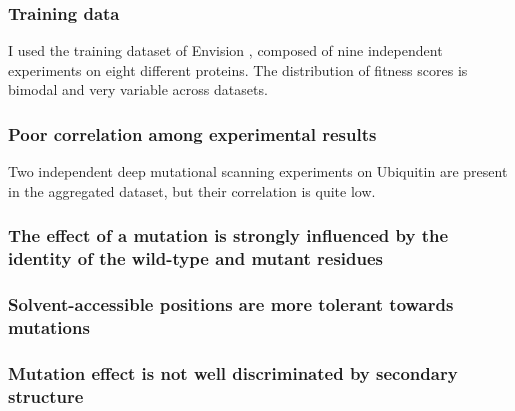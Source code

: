 \documentclass[10pt, british]{beamer}
\begin{document}
\begin{frame}
	\frametitle{Training data}
	I used the training dataset of Envision \parencite{Gray2018}, composed of nine independent experiments on eight different proteins.
	The distribution of fitness scores is bimodal and very variable across datasets.

	\vfill%
	\centering%
	
	
\end{frame}

\begin{frame}
	\frametitle{Poor correlation among experimental results}
	Two independent deep mutational scanning experiments on Ubiquitin are present in the aggregated dataset, but their correlation is quite low.
	\vfill%
	\centering%
	
\end{frame}

\begin{frame}
	\frametitle{The effect of a mutation is strongly influenced by the identity of the wild-type and mutant residues}
	\vfill%
	\centering%
	
\end{frame}

\begin{frame}
	\frametitle{Solvent-accessible positions are more tolerant towards mutations}
	\vfill%
	\centering%
	
\end{frame}

\begin{frame}
	\frametitle{Mutation effect is not well discriminated by secondary structure}
	\vfill%
	\centering%
	
\end{frame}
\end{document}

